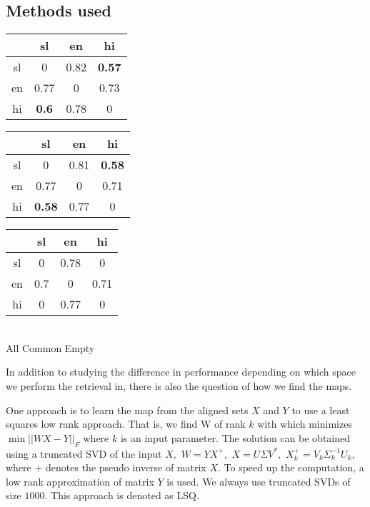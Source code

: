 \documentclass[twocolumn, draft]{article}
\begin{document}
\subsection{Methods used}
\vspace{-0.2cm}
\begin{table*}[!htbp]
\begin{center}
\caption{\label{lsi_all}CL-LSI MAPR retrieval, full pairwise space}
\begin{tabular}{|c|c|c|c|}\hline & sl & en & hi\\\hline sl & 0 & 0.82 & {\bf 0.57}\\\hline en & 0.77 & 0 & 0.73\\\hline hi & {\bf 0.6} & 0.78 & 0\\\hline\end{tabular}
\hspace{0.75cm}
\begin{tabular}{|c|c|c|c|} \hline& sl & en & hi \\\hline sl & 0 & 0.81 & {\bf 0.58}\\\hline en & 0.77 & 0 & 0.71\\\hline hi & {\bf 0.58} & 0.77 & 0\\\hline\end{tabular}
\hspace{0.75cm}
\begin{tabular}{|c|c|c|c|}\hline & sl & en & hi \\\hline sl & 0 & 0.78 & 0\\\hline en & 0.7 & 0 & 0.71\\\hline hi & 0 & 0.77 & 0 \\\hline\end{tabular}\\
\vspace{0.1cm}
\hspace{1cm}All \hspace{3.7cm} Common\hspace{3.7cm} Empty \hspace{0.7cm} \ \\
\end{center}
\end{table*}

In addition to studying the difference in performance depending
on which space we perform the retrieval in, there is also the
question of how we find the maps.

One approach is to learn the map from the aligned sets $X$ and
$Y$ to use a least squares low rank approach.  That is, we find W
of rank $k$ with which minimizes $\min || W X - Y||_F$ where $k$
is an input parameter. The solution can be obtained using a
truncated SVD of the input $X,$ $W = Y X^+,$ $X = U \Sigma V^*,$
$X_k^+ = V_k \Sigma_k^{-1} U_k,$ where $+$ denotes the pseudo
inverse of matrix $X.$ To speed up the computation, a low rank
approximation of matrix $Y$ is used.  We always use truncated
SVDs of size $1000.$ This approach is denoted as LSQ.
\end{document}
